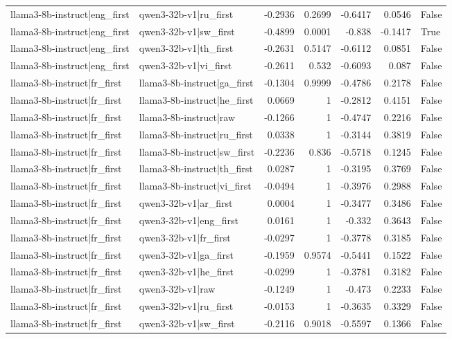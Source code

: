 \begin{table}
\begin{tabular}{l l r r r r l}
llama3-8b-instruct|eng_first & qwen3-32b-v1|ru_first & -0.2936 & 0.2699 & -0.6417 & 0.0546 & False \\
llama3-8b-instruct|eng_first & qwen3-32b-v1|sw_first & -0.4899 & 0.0001 & -0.838 & -0.1417 & True \\
llama3-8b-instruct|eng_first & qwen3-32b-v1|th_first & -0.2631 & 0.5147 & -0.6112 & 0.0851 & False \\
llama3-8b-instruct|eng_first & qwen3-32b-v1|vi_first & -0.2611 & 0.532 & -0.6093 & 0.087 & False \\
llama3-8b-instruct|fr_first & llama3-8b-instruct|ga_first & -0.1304 & 0.9999 & -0.4786 & 0.2178 & False \\
llama3-8b-instruct|fr_first & llama3-8b-instruct|he_first & 0.0669 & 1 & -0.2812 & 0.4151 & False \\
llama3-8b-instruct|fr_first & llama3-8b-instruct|raw & -0.1266 & 1 & -0.4747 & 0.2216 & False \\
llama3-8b-instruct|fr_first & llama3-8b-instruct|ru_first & 0.0338 & 1 & -0.3144 & 0.3819 & False \\
llama3-8b-instruct|fr_first & llama3-8b-instruct|sw_first & -0.2236 & 0.836 & -0.5718 & 0.1245 & False \\
llama3-8b-instruct|fr_first & llama3-8b-instruct|th_first & 0.0287 & 1 & -0.3195 & 0.3769 & False \\
llama3-8b-instruct|fr_first & llama3-8b-instruct|vi_first & -0.0494 & 1 & -0.3976 & 0.2988 & False \\
llama3-8b-instruct|fr_first & qwen3-32b-v1|ar_first & 0.0004 & 1 & -0.3477 & 0.3486 & False \\
llama3-8b-instruct|fr_first & qwen3-32b-v1|eng_first & 0.0161 & 1 & -0.332 & 0.3643 & False \\
llama3-8b-instruct|fr_first & qwen3-32b-v1|fr_first & -0.0297 & 1 & -0.3778 & 0.3185 & False \\
llama3-8b-instruct|fr_first & qwen3-32b-v1|ga_first & -0.1959 & 0.9574 & -0.5441 & 0.1522 & False \\
llama3-8b-instruct|fr_first & qwen3-32b-v1|he_first & -0.0299 & 1 & -0.3781 & 0.3182 & False \\
llama3-8b-instruct|fr_first & qwen3-32b-v1|raw & -0.1249 & 1 & -0.473 & 0.2233 & False \\
llama3-8b-instruct|fr_first & qwen3-32b-v1|ru_first & -0.0153 & 1 & -0.3635 & 0.3329 & False \\
llama3-8b-instruct|fr_first & qwen3-32b-v1|sw_first & -0.2116 & 0.9018 & -0.5597 & 0.1366 & False \\

\end{tabular}
\end{table}

